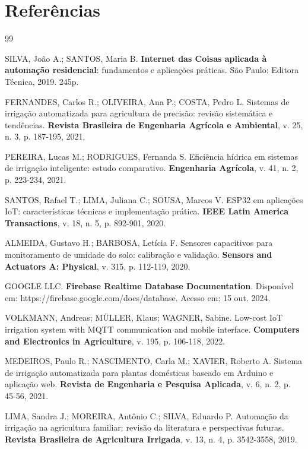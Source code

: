 \documentclass[twoside,english,brazilian]{UNISINOSmonografia}
\begin{document}
\chapter{Referências}



\begin{thebibliography}{99}

SILVA, João A.; SANTOS, Maria B. \textbf{Internet das Coisas aplicada à automação residencial}: fundamentos e aplicações práticas. São Paulo: Editora Técnica, 2019. 245p.

FERNANDES, Carlos R.; OLIVEIRA, Ana P.; COSTA, Pedro L. Sistemas de irrigação automatizada para agricultura de precisão: revisão sistemática e tendências. \textbf{Revista Brasileira de Engenharia Agrícola e Ambiental}, v. 25, n. 3, p. 187-195, 2021.

PEREIRA, Lucas M.; RODRIGUES, Fernanda S. Eficiência hídrica em sistemas de irrigação inteligente: estudo comparativo. \textbf{Engenharia Agrícola}, v. 41, n. 2, p. 223-234, 2021.

SANTOS, Rafael T.; LIMA, Juliana C.; SOUSA, Marcos V. ESP32 em aplicações IoT: características técnicas e implementação prática. \textbf{IEEE Latin America Transactions}, v. 18, n. 5, p. 892-901, 2020.

ALMEIDA, Gustavo H.; BARBOSA, Letícia F. Sensores capacitivos para monitoramento de umidade do solo: calibração e validação. \textbf{Sensors and Actuators A: Physical}, v. 315, p. 112-119, 2020.

GOOGLE LLC. \textbf{Firebase Realtime Database Documentation}. Disponível em: https://firebase.google.com/docs/database. Acesso em: 15 out. 2024.

VOLKMANN, Andreas; MÜLLER, Klaus; WAGNER, Sabine. Low-cost IoT irrigation system with MQTT communication and mobile interface. \textbf{Computers and Electronics in Agriculture}, v. 195, p. 106-118, 2022.

MEDEIROS, Paulo R.; NASCIMENTO, Carla M.; XAVIER, Roberto A. Sistema de irrigação automatizada para plantas domésticas baseado em Arduino e aplicação web. \textbf{Revista de Engenharia e Pesquisa Aplicada}, v. 6, n. 2, p. 45-56, 2021.

LIMA, Sandra J.; MOREIRA, Antônio C.; SILVA, Eduardo P. Automação da irrigação na agricultura familiar: revisão da literatura e perspectivas futuras. \textbf{Revista Brasileira de Agricultura Irrigada}, v. 13, n. 4, p. 3542-3558, 2019.

\end{thebibliography}
\end{document}
